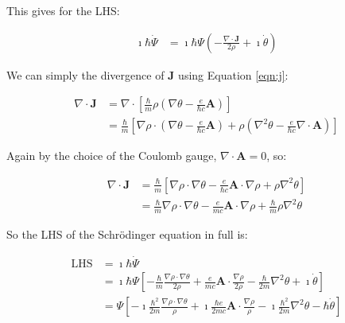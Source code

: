 This gives for the LHS:

\begin{align}
    \imath \hbar \dot \Psi &= \imath \hbar \Psi \left( - \frac{\nabla \cdot
    \mathbf{J}}{2\rho} + \imath \dot \theta \right)
\end{align}

We can simply the divergence of $\mathbf{J}$ using Equation \ref{eqn:j}:

\begin{align}
    \nabla \cdot \mathbf{J}
    &= \nabla \cdot \left[ \frac{\hbar}{m} \rho \left( \nabla \theta -
        \frac{e}{\hbar c} \mathbf{A} \right) \right] \\
    &= \frac{\hbar}{m} \left[ \nabla \rho \cdot \left( \nabla \theta -
        \frac{e}{\hbar c} \mathbf{A} \right) + \rho \left( \nabla^2 \theta -
        \frac{e}{\hbar c} \nabla \cdot \mathbf{A} \right) \right]
\end{align}

Again by the choice of the Coulomb gauge, $\nabla \cdot \mathbf{A} = 0$, so:

\begin{align}
    \nabla \cdot \mathbf{J}
    &= \frac{\hbar}{m} \left[ \nabla \rho \cdot \nabla \theta - \frac{e}{\hbar c}
        \mathbf{A} \cdot \nabla \rho + \rho \nabla^2 \theta \right] \\
    &= \frac{\hbar}{m} \nabla \rho \cdot \nabla \theta - \frac{e}{mc}
        \mathbf{A} \cdot \nabla \rho + \frac{\hbar}{m} \rho \nabla^2 \theta
\end{align}

So the LHS of the Schr\"odinger equation in full is:

\begin{align}
    \mathrm{LHS}
    &= \imath \hbar \dot \Psi \\
    &= \imath \hbar \Psi \left[ - \frac{\hbar}{m} \frac{\nabla \rho \cdot
        \nabla \theta}{2\rho} + \frac{e}{mc} \mathbf{A} \cdot \frac{\nabla
        \rho}{2\rho} - \frac{\hbar}{2m} \nabla^2 \theta + \imath \dot \theta
        \right] \\
    &= \Psi \left[ - \imath \frac{\hbar^2}{2m} \frac{\nabla \rho \cdot
        \nabla \theta}{\rho} + \imath \frac{\hbar e}{2mc} \mathbf{A} \cdot
        \frac{\nabla \rho}{\rho} - \imath \frac{\hbar^2}{2m} \nabla^2 \theta -
        \hbar \dot \theta \right]
\end{align}


